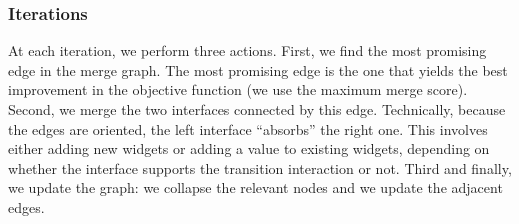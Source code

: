 	\subsubsection{Iterations}
	At each iteration, we perform three actions. First, we find the most promising edge in the merge graph. The most promising edge is the one that yields the best improvement in the objective function (we use the maximum merge score). Second, we merge the two interfaces connected by this edge. Technically, because the edges are oriented, the left interface ``absorbs'' the right one. This involves either adding new widgets or adding a value to existing widgets, depending on whether the interface supports the transition interaction or not. Third and finally, we update the graph: we collapse the relevant nodes and we update the adjacent edges.

\fi


